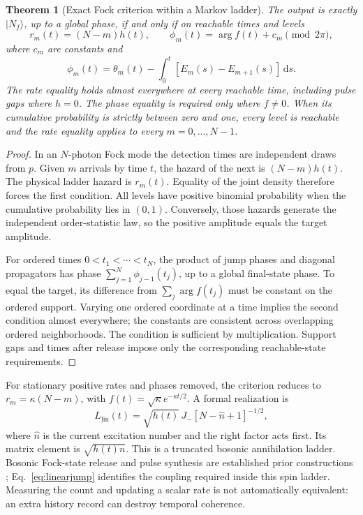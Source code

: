 \documentclass[11pt,a4paper]{article}
\newtheorem{theorem}{Theorem}
\newcommand{\Fock}[2]{\lvert #1_{#2}\rangle}
\newcommand{\dd}{\,\mathrm d}
\begin{document}
\begin{theorem}[Exact Fock criterion within a Markov ladder]
The output is exactly \(\Fock{N}{f}\), up to a global phase, if and
only if on reachable times and levels
\begin{equation}
 r_m(t)=(N-m)h(t),\qquad
 \phi_m(t)=\arg f(t)+c_m\pmod{2\pi},
 \label{eq:exactcriterion}
\end{equation}
where \(c_m\) are constants and
\begin{equation}
 \phi_m(t)=\theta_m(t)
 -\int_0^t[E_m(s)-E_{m+1}(s)]\dd s .
 \label{eq:phase}
\end{equation}
The rate equality holds almost everywhere at every reachable time,
including pulse gaps where \(h=0\). The phase equality is required
only where \(f\ne0\).
When its cumulative probability is strictly between zero and one,
every level is reachable and the rate equality applies to every
\(m=0,\ldots,N-1\).
\end{theorem}
\begin{proof}
In an \(N\)-photon Fock mode the detection times are independent
draws from \(p\). Given \(m\) arrivals by time \(t\), the hazard of
the next is \((N-m)h(t)\). The physical ladder hazard is \(r_m(t)\).
Equality of the joint density therefore forces the first condition.
All levels have positive binomial probability when the cumulative
probability lies in \((0,1)\). Conversely, those hazards generate
the independent order-statistic law, so the positive amplitude
equals the target amplitude.

For ordered times \(0<t_1<\cdots<t_N\), the product of jump phases
and diagonal propagators has phase
\(\sum_{j=1}^N\phi_{j-1}(t_j)\), up to a global final-state phase.
To equal the target, its difference from
\(\sum_j\arg f(t_j)\) must be constant on the ordered support.
Varying one ordered coordinate at a time implies the second
condition almost everywhere; the constants are consistent across
overlapping ordered neighborhoods. The condition is sufficient
by multiplication. Support gaps and times after release impose
only the corresponding reachable-state requirements.
\end{proof}

For stationary positive rates and phases removed, the criterion
reduces to \(r_m=\kappa(N-m)\), with
\(f(t)=\sqrt{\kappa}e^{-\kappa t/2}\). A formal realization is
\begin{equation}
 L_{\mathrm{lin}}(t)
 =\sqrt{h(t)}\,J_-[N-\hat n+1]^{-1/2},
 \label{eq:linearjump}
\end{equation}
where \(\hat n\) is the current excitation number and the right
factor acts first. Its matrix element is \(\sqrt{h(t)n}\).
This is a truncated bosonic annihilation ladder. Bosonic
Fock-state release and pulse synthesis are established prior
constructions \cite{gough,brown,pfaff}; Eq.~\eqref{eq:linearjump}
identifies the coupling required inside this spin ladder.
Measuring the count and updating a scalar rate is not automatically
equivalent: an extra history record can destroy temporal coherence.
\end{document}

